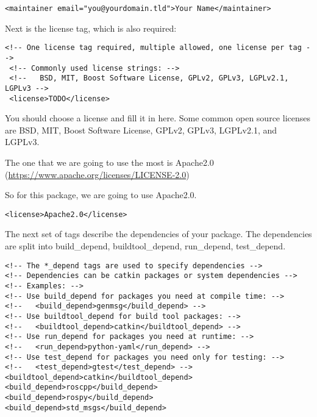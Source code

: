 \begin{lstlisting}[breaklines=true languages=xml]
<maintainer email="you@yourdomain.tld">Your Name</maintainer>
\end{lstlisting}

\noindent Next is the license tag, which is also required:
\begin{lstlisting}[breaklines=true languages=xml]
 <!-- One license tag required, multiple allowed, one license per tag -->
 <!-- Commonly used license strings: -->
 <!--   BSD, MIT, Boost Software License, GPLv2, GPLv3, LGPLv2.1, LGPLv3 -->
 <license>TODO</license>
\end{lstlisting}

\noindent You should choose a license and fill it in here. Some common open source licenses are BSD, MIT, Boost Software License, GPLv2, GPLv3, LGPLv2.1, and LGPLv3.
\newline

\noindent The one that we are going to use the most is Apache2.0 (\url{https://www.apache.org/licenses/LICENSE-2.0})
\newline

\noindent So for this package, we are going to use Apache2.0.

\begin{lstlisting}[breaklines=true languages=xml]
 <license>Apache2.0</license>
\end{lstlisting}

\newpage

\noindent The next set of tags describe the dependencies of your package. The dependencies are split into build\_depend, buildtool\_depend, run\_depend, test\_depend.

\begin{lstlisting}[breaklines=true languages=xml]
<!-- The *_depend tags are used to specify dependencies -->
<!-- Dependencies can be catkin packages or system dependencies -->
<!-- Examples: -->
<!-- Use build_depend for packages you need at compile time: -->
<!--   <build_depend>genmsg</build_depend> -->
<!-- Use buildtool_depend for build tool packages: -->
<!--   <buildtool_depend>catkin</buildtool_depend> -->
<!-- Use run_depend for packages you need at runtime: -->
<!--   <run_depend>python-yaml</run_depend> -->
<!-- Use test_depend for packages you need only for testing: -->
<!--   <test_depend>gtest</test_depend> -->
<buildtool_depend>catkin</buildtool_depend>
<build_depend>roscpp</build_depend>
<build_depend>rospy</build_depend>
<build_depend>std_msgs</build_depend>
\end{lstlisting}

